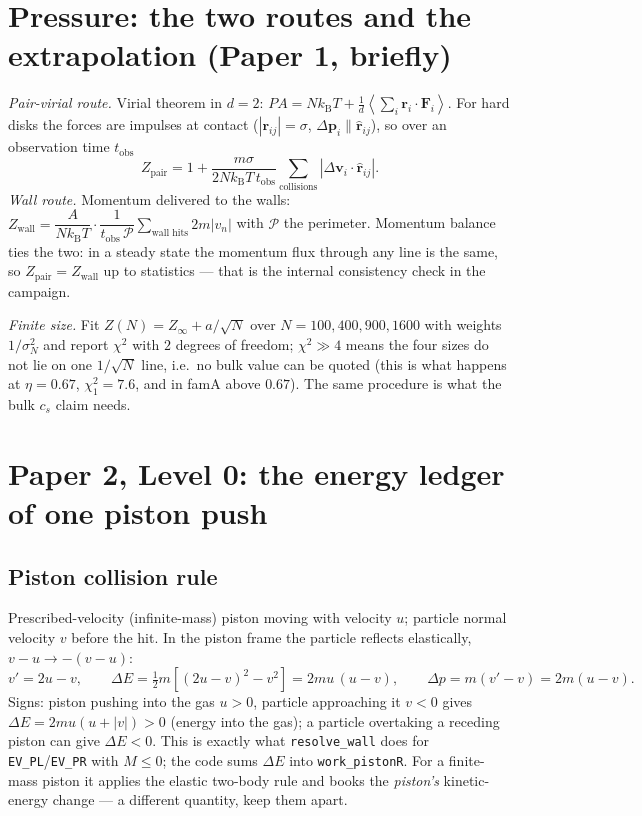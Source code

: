 \documentclass[11pt,a4paper]{article}
\newcommand{\kT}{k_{\mathrm B}T}
\newcommand{\ie}{i.e.\ }
\newcommand{\avg}[1]{\left\langle #1 \right\rangle}
\begin{document}
\section{Pressure: the two routes and the extrapolation (Paper 1, briefly)}

\emph{Pair-virial route.} Virial theorem in $d = 2$: $PA = N\kT + \frac1d\avg{\sum_i \mathbf r_i\cdot\mathbf F_i}$. For hard disks the forces are impulses at contact ($|\mathbf r_{ij}| = \sigma$, $\Delta\mathbf p_i \parallel \hat{\mathbf r}_{ij}$), so over an observation time $t_{\mathrm{obs}}$
\begin{equation}
Z_{\mathrm{pair}} = 1 + \frac{m\sigma}{2N\kT\,t_{\mathrm{obs}}}\sum_{\text{collisions}}\left|\Delta\mathbf v_i\cdot\hat{\mathbf r}_{ij}\right| .
\end{equation}
\emph{Wall route.} Momentum delivered to the walls: $Z_{\mathrm{wall}} = \dfrac{A}{N\kT}\cdot\dfrac{1}{t_{\mathrm{obs}}\,\mathcal P}\sum_{\text{wall hits}} 2m|v_n|$ with $\mathcal P$ the perimeter. Momentum balance ties the two: in a steady state the momentum flux through any line is the same, so $Z_{\mathrm{pair}} = Z_{\mathrm{wall}}$ up to statistics --- that is the internal consistency check in the campaign.

\emph{Finite size.} Fit $Z(N) = Z_\infty + a/\sqrt N$ over $N = 100, 400, 900, 1600$ with weights $1/\sigma_N^2$ and report $\chi^2$ with $2$ degrees of freedom; $\chi^2 \gg 4$ means the four sizes do not lie on one $1/\sqrt N$ line, \ie no bulk value can be quoted (this is what happens at $\eta = 0.67$, $\chi^2_1 = 7.6$, and in famA above $0.67$). The same procedure is what the bulk $c_s$ claim needs.

\section{Paper 2, Level 0: the energy ledger of one piston push}

\subsection{Piston collision rule}
Prescribed-velocity (infinite-mass) piston moving with velocity $u$; particle normal velocity $v$ before the hit. In the piston frame the particle reflects elastically, $v - u \to -(v-u)$:
\begin{equation}
v' = 2u - v,\qquad
\Delta E = \tfrac12 m\left[(2u-v)^2 - v^2\right] = 2mu\,(u - v),\qquad
\Delta p = m(v'-v) = 2m(u-v).
\label{eq:piston}
\end{equation}
Signs: piston pushing into the gas $u>0$, particle approaching it $v<0$ gives $\Delta E = 2mu(u+|v|) > 0$ (energy into the gas); a particle overtaking a receding piston can give $\Delta E<0$. This is exactly what \texttt{resolve\_wall} does for \texttt{EV\_PL}/\texttt{EV\_PR} with $M \le 0$; the code sums $\Delta E$ into \texttt{work\_pistonR}. For a finite-mass piston it applies the elastic two-body rule and books the \emph{piston's} kinetic-energy change --- a different quantity, keep them apart.
\end{document}
